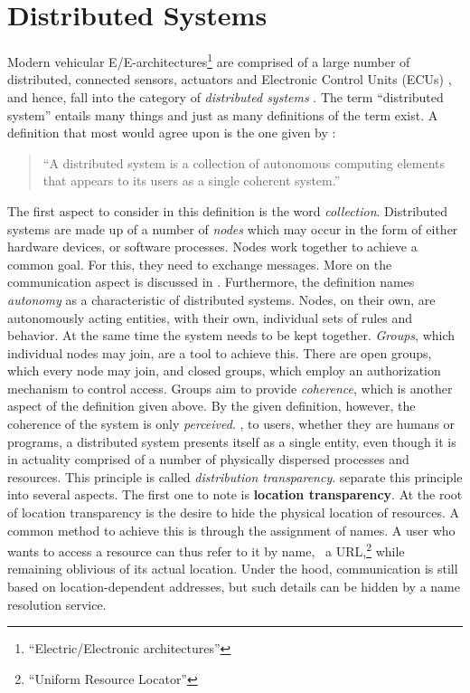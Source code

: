 \section{Distributed Systems}
Modern vehicular E/E-architectures\footnote{``Electric/Electronic architectures''} are comprised of a large number of distributed, connected sensors, actuators and Electronic Control Units (ECUs) \cite{navet2005trends}, and hence, fall into the category of \emph{distributed systems} \cite{leen2002expanding}. The term ``distributed system'' entails many things and just as many definitions of the term exist. A definition that most would agree upon is the one given by \citeauthor{tanenbaum2017distributed} \cite{tanenbaum2017distributed}:
\begin{quote}
``A distributed system is a collection of autonomous computing elements that appears to its users as a single coherent system.''
\end{quote}
The first aspect to consider in this definition is the word \emph{collection}. Distributed systems are made up of a number of \emph{nodes} which may occur in the form of either hardware devices, or software processes. Nodes work together to achieve a common goal. For this, they need to exchange messages. More on the communication aspect is discussed in . Furthermore, the definition names \emph{autonomy} as a characteristic of distributed systems. Nodes, on their own, are autonomously acting entities, with their own, individual sets of rules and behavior. At the same time the system needs to be kept together. \emph{Groups}, which individual nodes may join, are a tool to achieve this. There are open groups, which every node may join, and closed groups, which employ an authorization mechanism to control access.
Groups aim to provide \emph{coherence}, which is another aspect of the definition given above. By the given definition, however, the coherence of the system is only \emph{perceived}. \Ie , to users, whether they are humans or programs, a distributed system presents itself as a single entity, even though it is in actuality comprised of a number of physically dispersed processes and resources. This principle is called \emph{distribution transparency}. \citeauthor*{tanenbaum2017distributed} \cite{tanenbaum2017distributed} separate this principle into several aspects. The first one to note is \textbf{location transparency}. At the root of location transparency is the desire to hide the physical location of resources. A common method to achieve this is through the assignment of names. A user who wants to access a resource can thus refer to it by name, \eg\ a URL,\footnote{``Uniform Resource Locator''} while remaining oblivious of its actual location. Under the hood, communication is still based on location-dependent addresses, but such details can be hidden by a name resolution service.
